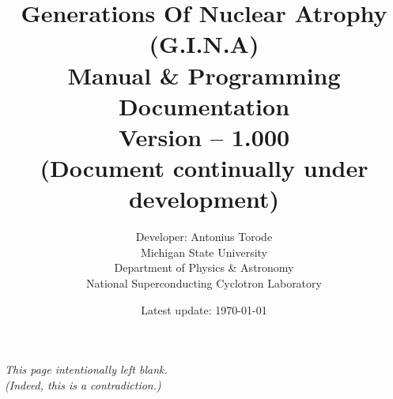\documentclass[openany,a4paper,11pt]{book}
\title{Generations Of Nuclear Atrophy (G.I.N.A) \\  Manual \& Programming Documentation \\ Version -- 1.000 \\ (Document continually under development) \\ \vspace{1cm}  
}
\author{Developer: Antonius Torode \\ Michigan State University \\ Department of Physics \& Astronomy \\ National Superconducting Cyclotron Laboratory}
\date{Latest update: \today}
\begin{document}
\frontmatter
\maketitle

\tableofcontents
\newpage
\vspace*{\fill}
\begin{center}
	\textit{This page intentionally left blank. \\ (Indeed, this is a contradiction.)}
\end{center}
\vspace*{\fill}

\mainmatter
\pagestyle{fancy}
\fancyhf{}
\fancyhead[RO, LE]{\thepage}





\backmatter


\end{document}
